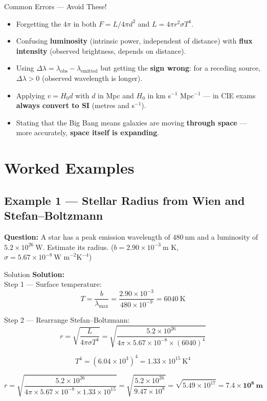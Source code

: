 \begin{warningbox}{Common Errors — Avoid These!}
\begin{itemize}[itemsep=3pt]
  \item Forgetting the \textbf{$4\pi$} in both $F = L/4\pi d^2$ and $L = 4\pi r^2\sigma T^4$.
  \item Confusing \textbf{luminosity} (intrinsic power, independent of distance) with \textbf{flux intensity} (observed brightness, depends on distance).
  \item Using $\Delta\lambda = \lambda_{\text{obs}} - \lambda_{\text{emitted}}$ but getting the \textbf{sign wrong}: for a receding source, $\Delta\lambda > 0$ (observed wavelength is longer).
  \item Applying $v = H_0 d$ with $d$ in Mpc and $H_0$ in km s$^{-1}$ Mpc$^{-1}$ — in CIE exams \textbf{always convert to SI} (metres and s$^{-1}$).
  \item Stating that the Big Bang means galaxies are moving \textbf{through space} — more accurately, \textbf{space itself is expanding}.
\end{itemize}
\end{warningbox}

\section{Worked Examples}

\subsection*{Example 1 — Stellar Radius from Wien and Stefan--Boltzmann}

\textbf{Question:} A star has a peak emission wavelength of $480\ \text{nm}$ and a luminosity of $5.2\times10^{26}\ \text{W}$. Estimate its radius. ($b = 2.90\times10^{-3}\ \text{m K}$, $\sigma = 5.67\times10^{-8}\ \text{W m}^{-2}\text{K}^{-4}$)

\begin{examplebox}{Solution}
\textbf{Solution:}\\
Step 1 — Surface temperature:
$$T = \frac{b}{\lambda_{\max}} = \frac{2.90\times10^{-3}}{480\times10^{-9}} = 6040\ \text{K}$$

Step 2 — Rearrange Stefan--Boltzmann:
$$r = \sqrt{\frac{L}{4\pi\sigma T^4}} = \sqrt{\frac{5.2\times10^{26}}{4\pi \times 5.67\times10^{-8} \times (6040)^4}}$$

$$T^4 = (6.04\times10^3)^4 = 1.33\times10^{15}\ \text{K}^4$$

$$r = \sqrt{\frac{5.2\times10^{26}}{4\pi \times 5.67\times10^{-8} \times 1.33\times10^{15}}} = \sqrt{\frac{5.2\times10^{26}}{9.47\times10^8}} = \sqrt{5.49\times10^{17}} = \mathbf{7.4\times10^8\ \text{m}}$$
\end{examplebox}

